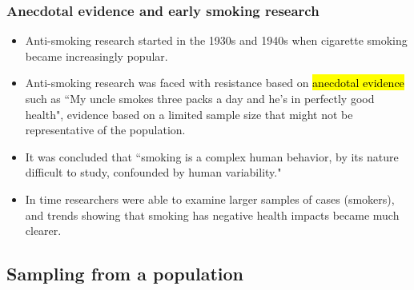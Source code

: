 \begin{frame}
\frametitle{Anecdotal evidence and early smoking research}

\begin{itemize}

\item Anti-smoking research started in the 1930s and 1940s when cigarette smoking became increasingly popular. 

\item Anti-smoking research was faced with resistance based on \hl{anecdotal evidence} such as ``My uncle smokes three packs a day and he's in perfectly good health", evidence based on a limited sample size that might not be representative of the population.

\item It was concluded that ``smoking is a complex human behavior, by its nature difficult to study, confounded by human variability."

\item In time researchers were able to examine larger samples of cases (smokers), and trends showing that smoking has negative health impacts became much clearer.

\end{itemize}


\end{frame}


\subsection{Sampling from a population}


